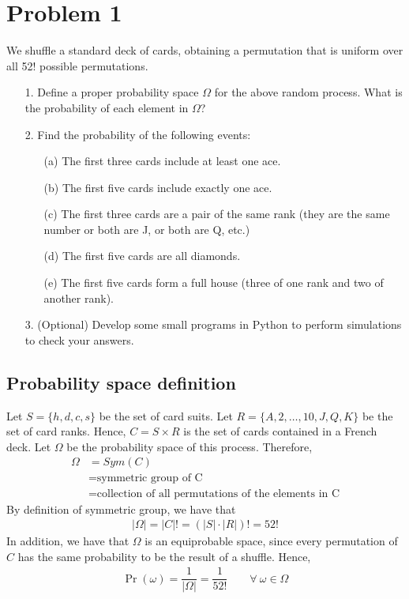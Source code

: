 
\section{Problem 1}

We shuffle a standard deck of cards, obtaining a permutation that is uniform over all
52! possible permutations.
\begin{itemize}
	\item[1.] Define a proper probability space $\Omega$ for the above random process. What is the probability of each element in $\Omega$?
	\item[2.] Find the probability of the following events:
	\begin{itemize}
		\item[(a)] The first three cards include at least one ace.
		\item[(b)] The first five cards include exactly one ace.
		\item[(c)] The first three cards are a pair of the same rank (they are the same number or both are J, or both are Q, etc.)
		\item[(d)] The first five cards are all diamonds.
		\item[(e)] The first five cards form a full house (three of one rank and two of another rank).		
	\end{itemize}
	\item[3.] (Optional) Develop some small programs in Python to perform simulations to check your answers.
\end{itemize}


\subsection{Probability space definition}

Let $S = \{h, d, c, s\}$ be the set of card suits. Let $R = \{A, 2, \ldots, 10, J, Q, K\}$ be the set of card ranks. Hence, $C = S \times R$ is the set of cards contained in a French deck. Let $\Omega$ be the probability space of this process. Therefore,
\begin{align*}
	\Omega &= Sym(C)\\
		&= \text{symmetric group of C}\\
		&= \text{collection of all permutations of the elements in C}
\end{align*}
By definition of symmetric group\cite{sym_group}, we have that
\begin{align*}
	|\Omega| = |C|! = (|S| \cdot |R|)! = 52!
\end{align*}
In addition, we have that $\Omega$ is an equiprobable space, since every permutation of $C$ has the same probability to be the result of a shuffle. Hence,
\begin{align*}
	\Pr(\omega) = \dfrac{1}{|\Omega|} = \dfrac{1}{52!} \qquad \forall \ \omega\in\Omega
\end{align*}


